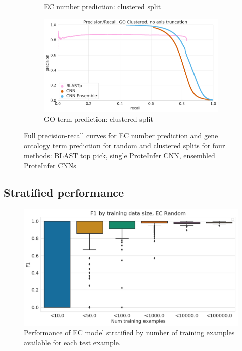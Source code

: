 \begin{figure}[ht]
\begin{subfigure}[b]{0.5\linewidth}
    \caption{EC number prediction: clustered split} 
    \label{fig:without_ensemble:c} 
  \end{subfigure}%
  \begin{subfigure}[b]{0.5\linewidth}
    \centering
    \includegraphics[width=0.9\linewidth]{Figures/prc_go_clustered_unzoomed.png}
    \caption{GO term prediction: clustered split} 
    \label{fig:without_ensemble:d} 
  \end{subfigure} 
  \caption{Full precision-recall curves for EC number prediction and gene ontology term prediction for random and clustered splits for four methods: BLAST top pick, single ProteInfer CNN, ensembled ProteInfer CNNs }
  \label{fig:without_ensemble} 
\end{figure}



\clearpage


\subsection{Stratified performance}
\begin{figure}[htbp]
\centering
  \includegraphics[width=\textwidth]{Figures/ec_f1_by_training_size.png}
  \caption{Performance of EC model stratified by number of training examples available for each test example.}
  \label{sup:fig:ec_f1_by_training_size}
\end{figure}

